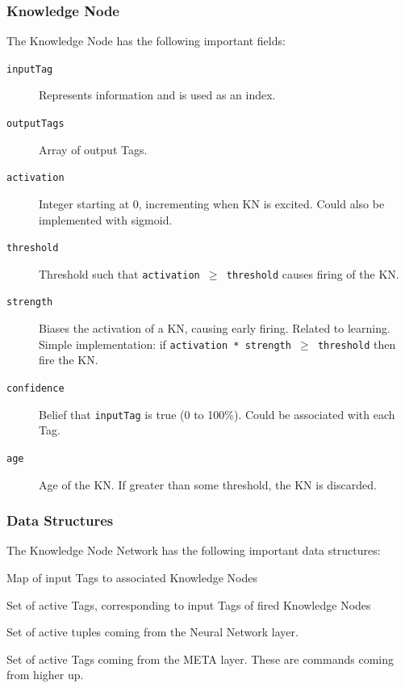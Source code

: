 \documentclass{beamer}
\newcommand{\code}[1]{\texttt{#1}}
\begin{document}
	\begin{frame}
		\frametitle{Knowledge Node}
		The Knowledge Node has the following important fields:
		\begin{description}
			\item[\code{inputTag}] Represents information and is used as an index.
			\item[\code{outputTags}] Array of output Tags.
			\item[\code{activation}] Integer starting at 0, incrementing when KN is excited. Could also be implemented with sigmoid.
			\item[\code{threshold}] Threshold such that \code{activation $\geq$ threshold} causes firing of the KN.
			\item[\code{strength}] Biases the activation of a KN, causing early firing. Related to learning. Simple implementation: if \code{activation * strength $\geq$ threshold} then fire the KN.
			\item[\code{confidence}] Belief that \code{inputTag} is true (0 to 100\%). Could be associated with each Tag.
			\item[\code{age}] Age of the KN. If greater than some threshold, the KN is discarded.
		\end{description}
	\end{frame}
	
	\begin{frame}
		\frametitle{Data Structures}
		The Knowledge Node Network has the following important data structures:
		\begin{description}[\code{activeTagsMETA}]
			\item[\code{mapKN}] Map of input Tags to associated Knowledge Nodes
			\item[\code{activeTags}] Set of active Tags, corresponding to input Tags of fired Knowledge Nodes
			\item[\code{activeTuplesNN}] Set of active tuples coming from the Neural Network layer.
			\item[\code{activeTagsMETA}] Set of active Tags coming from the META layer. These are commands coming from higher up.
		\end{description}
	\end{frame}
\end{document}
